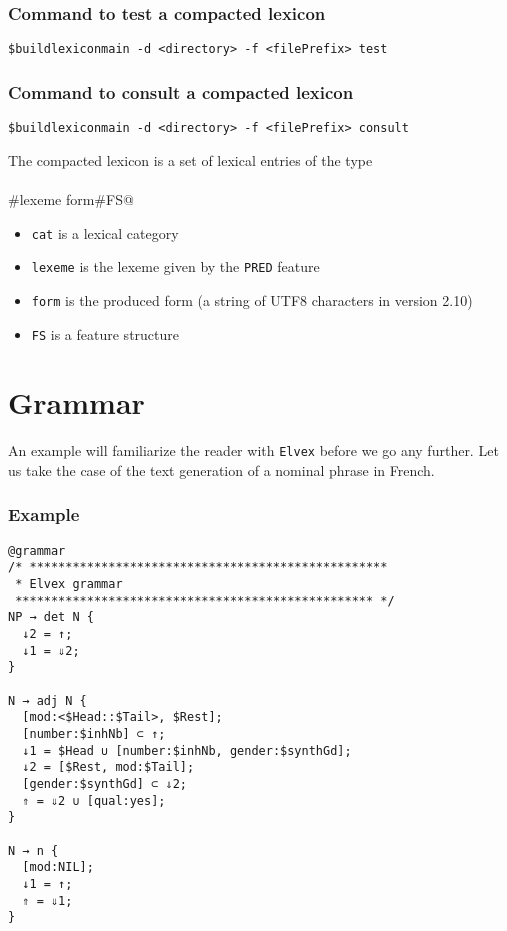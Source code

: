 \documentclass[11pt]{article}
\begin{document}
\subsubsection*{Command to test a compacted lexicon}

\begin{description}
\item \verb#$buildlexiconmain -d <directory> -f <filePrefix> test# 

\subsubsection*{Command to consult a compacted lexicon}

\item \verb#$buildlexiconmain -d <directory> -f <filePrefix> consult# 

\end{description}

The compacted lexicon is a set of lexical entries of the type

\paragraph{}\verb@cat#lexeme	form#FS@

\begin{itemize}
\item \verb#cat# is a lexical category
\item \verb#lexeme# is the lexeme given by the \verb#PRED# feature
\item \verb#form# is the produced form (a string of UTF8 characters in version 2.10)
\item \verb#FS# is a feature structure
\end{itemize}

\newpage
\section{Grammar}

An example will familiarize the reader with \texttt{Elvex}
before we go any further. Let us take the case of the text generation of a
nominal phrase in French.

\subsubsection*{Example}

\begin{lstlisting}
@grammar
/* **************************************************
 * Elvex grammar
 ************************************************** */
NP → det N {
  ↓2 = ↑;
  ↓1 = ⇓2;
}

N → adj N {
  [mod:<$Head::$Tail>, $Rest];
  [number:$inhNb] ⊂ ↑;
  ↓1 = $Head ∪ [number:$inhNb, gender:$synthGd];
  ↓2 = [$Rest, mod:$Tail];
  [gender:$synthGd] ⊂ ⇓2;
  ⇑ = ⇓2 ∪ [qual:yes];
}

N → n {
  [mod:NIL];
  ↓1 = ↑;
  ⇑ = ⇓1;
}
\end{lstlisting}
\end{document}
